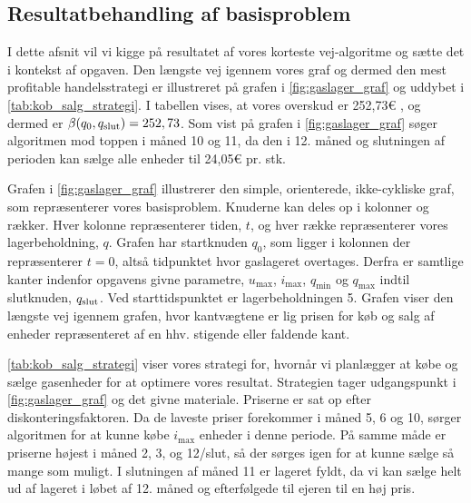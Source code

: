 \subsection{Resultatbehandling af basisproblem}

I dette afsnit vil vi kigge på resultatet af vores korteste vej-algoritme og sætte det i kontekst af opgaven. Den længste vej igennem vores graf og dermed den mest profitable handelsstrategi er illustreret på grafen i \autoref{fig:gaslager_graf} og uddybet i \autoref{tab:kob_salg_strategi}. I tabellen vises, at vores overskud er 252,73€ %
, og dermed er $\beta (q_0, q_{\textrm{slut}}) = 252,73$. Som vist på grafen i \autoref{fig:gaslager_graf} søger algoritmen mod toppen i måned 10 og 11, da den i 12. måned og slutningen af perioden kan sælge alle enheder til 24,05€ pr. stk. 



Grafen i \autoref{fig:gaslager_graf} illustrerer den simple, orienterede, ikke-cykliske graf, som repræsenterer vores basisproblem. Knuderne kan deles op i kolonner og rækker. Hver kolonne repræsenterer tiden, $t$, og hver række repræsenterer vores lagerbeholdning, $q$. Grafen har startknuden $q_0$, som ligger i kolonnen der repræsenterer $t=0$, altså tidpunktet hvor gaslageret overtages. Derfra er samtlige kanter indenfor opgavens givne parametre, $u_{\max }$, $i_{\max }$, $q_{\min }$ og $q_{\max }$ indtil slutknuden, $q_{\textrm{slut}}$. Ved starttidspunktet er lagerbeholdningen 5. Grafen viser den længste vej igennem grafen, hvor kantvægtene er lig prisen for køb og salg af enheder repræsenteret af en hhv. stigende eller faldende kant.



\autoref{tab:kob_salg_strategi} viser vores strategi for, hvornår vi planlægger at købe og sælge gasenheder for at optimere vores resultat. Strategien tager udgangspunkt i \autoref{fig:gaslager_graf} og det givne materiale. Priserne er sat op efter diskonteringsfaktoren.%
 Da de laveste priser forekommer i måned 5, 6 og 10, sørger algoritmen for at kunne købe $i_{\max}$ enheder i denne periode. På samme måde er priserne højest i måned 2, 3, og 12/slut, så der sørges igen for at kunne sælge så mange som muligt. I slutningen af måned 11 er lageret fyldt, da vi kan sælge helt ud af lageret i løbet af 12. måned og efterfølgede til ejeren til en høj pris.
